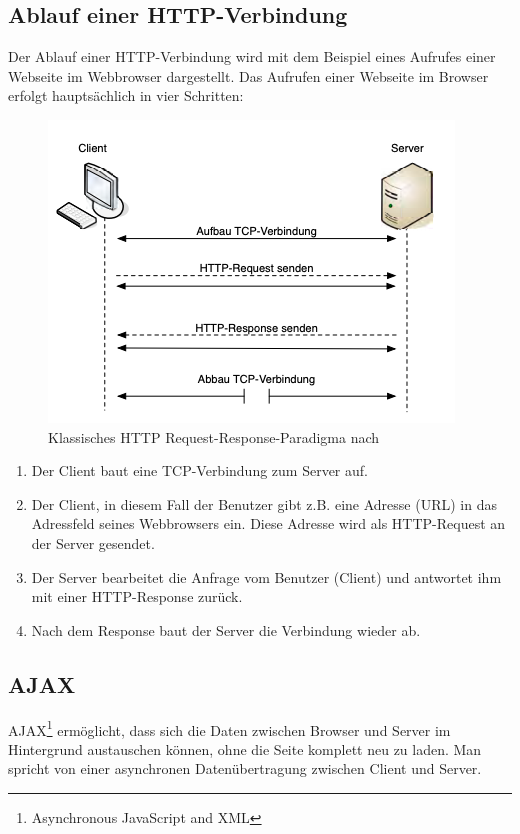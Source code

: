 \subsection{Ablauf einer HTTP-Verbindung}
\label{sec:ablauf einer http-verbindung}
Der Ablauf einer HTTP-Verbindung wird mit dem Beispiel eines Aufrufes einer Webseite im Webbrowser dargestellt. Das Aufrufen einer Webseite im Browser erfolgt hauptsächlich in vier Schritten:

\begin{figure}[H]
  \begin{center}
    \includegraphics[scale=0.5]{img/http-request-response}
	\caption{Klassisches HTTP Request-Response-Paradigma nach \cite{Wöhr2004}}
	\label{fig:http-request-response}
  \end{center}   
\end{figure}

\newpage
\begin{enumerate}
\item Der Client baut eine TCP-Verbindung zum Server auf.
\item Der Client, in diesem Fall der Benutzer gibt z.B. eine Adresse (URL) in das Adressfeld seines Webbrowsers ein. Diese Adresse wird als HTTP-Request an der Server gesendet.
\item Der Server bearbeitet die Anfrage vom Benutzer (Client) und antwortet ihm mit einer HTTP-Response zurück.
\item Nach dem Response baut der Server die Verbindung wieder ab.
\end{enumerate}

\subsection{AJAX}
\label{sec:ajax}
AJAX\footnote{Asynchronous JavaScript and XML} ermöglicht, dass sich die Daten zwischen Browser und Server im Hintergrund austauschen können, ohne die Seite komplett neu zu laden. Man spricht von einer asynchronen Datenübertragung zwischen Client und Server.\bigskip

